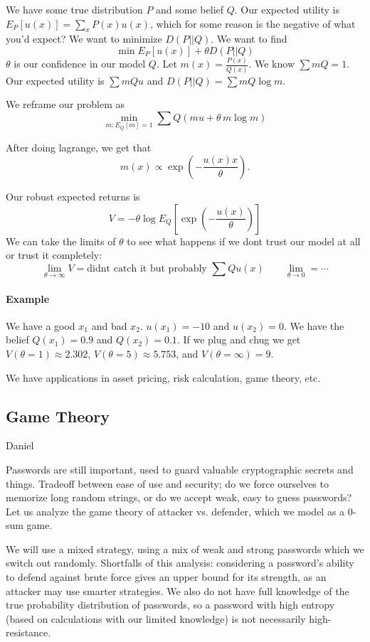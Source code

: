 \documentclass[12pt]{article}
\theoremstyle{remark}
\begin{document}
We have some true distribution $P$ and some belief $Q$. Our expected utility is $E_P[u(x)]=\sum_x P(x) u(x)$, which for some reason is the negative of what you'd expect? We want to minimize $D(P||Q)$. We want to find
\[
\min E_P[u(x)] + \theta D(P||Q)
\]
$\theta$ is our confidence in our model $Q$. 
Let $m(x) = \frac{P(x)}{Q(x)}$. We know $\sum m Q=1$. Our expected utility is $\sum m Q u$ and $D(P||Q) = \sum m Q \log m$.

We reframe our problem as
\[
\min_{m:E_Q[m]=1} \sum Q\left(m u+ \theta\, m\log m\right)
\]

After doing lagrange, we get that \[m(x) \propto \exp\left(-\frac{u(x) x}{\theta}\right).\]

Our robust expected returns is
\[
V = - \theta \log E_Q\left[\exp\left(-\frac{u(x)}{\theta}\right)\right]
\]
We can take the limits of $\theta$ to see what happens if we dont trust our model at all or trust it completely:
\[
\lim_{\theta\to\infty} V = \text{didnt catch it but probably }\sum Q u(x) \qquad \lim_{\theta\to0}=\cdots
\]

\paragraph{Example}
We have a good $x_1$ and bad $x_2$. $u(x_1)=-10$ and $u(x_2)=0$. We have the belief $Q(x_1) = 0.9$ and $Q(x_2)=0.1$. If we plug and chug we get $V(\theta=1) \approx 2.302$, $V(\theta=5)\approx 5.753$, and $V(\theta =\infty) = 9$.

We have applications in asset pricing, risk calculation, game theory, etc.

\subsection{Game Theory}
Daniel

Passwords are still important, used to guard valuable cryptographic secrets and things. Tradeoff between ease of use and security; do we force ourselves to memorize long random strings, or do we accept weak, easy to guess passwords? Let us analyze the game theory of attacker vs. defender, which we model as a 0-sum game.

We will use a mixed strategy, using a mix of weak and strong passwords which we switch out randomly. Shortfalls of this analysis: considering a password's ability to defend against brute force gives an upper bound for its strength, as an attacker may use smarter strategies. We also do not have full knowledge of the true probability distribution of passwords, so a password with high entropy (based on calculations with our limited knowledge) is not necessarily high-resistance. 
\end{document}
